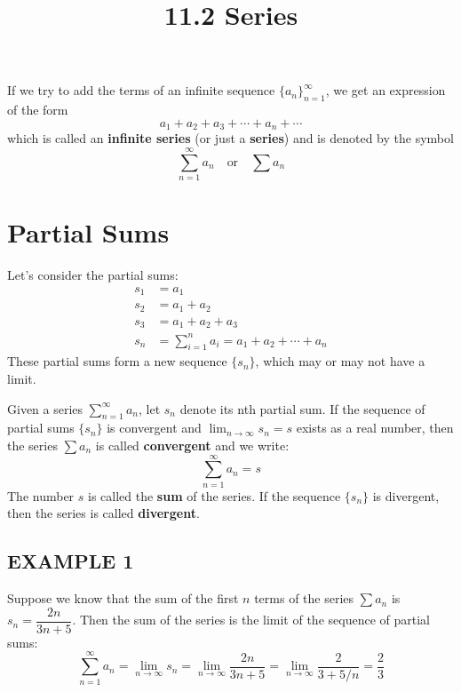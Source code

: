 \documentclass{article}
\title{11.2 Series}
\date{}
\author{}
\begin{document}
\maketitle

If we try to add the terms of an infinite sequence \(\{a_n\}_{n=1}^\infty\), we get an expression of the form
\[ a_1 + a_2 + a_3 + \cdots + a_n + \cdots \]
which is called an \textbf{infinite series} (or just a \textbf{series}) and is denoted by the symbol
\[ \sum_{n=1}^{\infty} a_n \quad \text{or} \quad \sum a_n \]

\section*{Partial Sums}
Let's consider the partial sums:
\begin{align*}
s_1 &= a_1 \\
s_2 &= a_1 + a_2 \\
s_3 &= a_1 + a_2 + a_3 \\
s_n &= \sum_{i=1}^{n} a_i = a_1 + a_2 + \cdots + a_n
\end{align*}
These partial sums form a new sequence \(\{s_n\}\), which may or may not have a limit.

\begin{tcolorbox}[
    colback=white,
    colframe=orange!80!white,
    title=Definition of a Convergent Series,
    boxrule=0.5mm,
    arc=3mm
    ]
    Given a series \( \sum_{n=1}^{\infty} a_n \), let \(s_n\) denote its nth partial sum. If the sequence of partial sums \(\{s_n\}\) is convergent and \( \lim_{n\to\infty} s_n = s \) exists as a real number, then the series \( \sum a_n \) is called \textbf{convergent} and we write:
    \[ \sum_{n=1}^{\infty} a_n = s \]
    The number \(s\) is called the \textbf{sum} of the series. If the sequence \(\{s_n\}\) is divergent, then the series is called \textbf{divergent}.
\end{tcolorbox}

\subsection*{EXAMPLE 1}
Suppose we know that the sum of the first \(n\) terms of the series \( \sum a_n \) is \( s_n = \dfrac{2n}{3n+5} \). Then the sum of the series is the limit of the sequence of partial sums:
\[ \sum_{n=1}^{\infty} a_n = \lim_{n\to\infty} s_n = \lim_{n\to\infty} \dfrac{2n}{3n+5} = \lim_{n\to\infty} \dfrac{2}{3+5/n} = \dfrac{2}{3} \]
\end{document}
